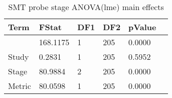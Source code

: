 \begin{table}
\centering
\begin{tabular}[0.2em]{@{}llllll@{}}\toprule
Term & FStat & DF1 & DF2 & pValue\\\toprule[0.2em]
(Intercept) & 168.1175 & 1 & 205 & 0.0000 \\\midrule
Study & 0.2831 & 1 & 205 & 0.5952 \\\midrule
Stage & 80.9884 & 2 & 205 & 0.0000 \\\midrule
Metric & 80.0598 & 1 & 205 & 0.0000 \\\bottomrule[0.2em]
\end{tabular}
\caption{SMT probe stage ANOVA(lme) main effects \label{tabel:SMTlmeAnova}}
\end{table}
